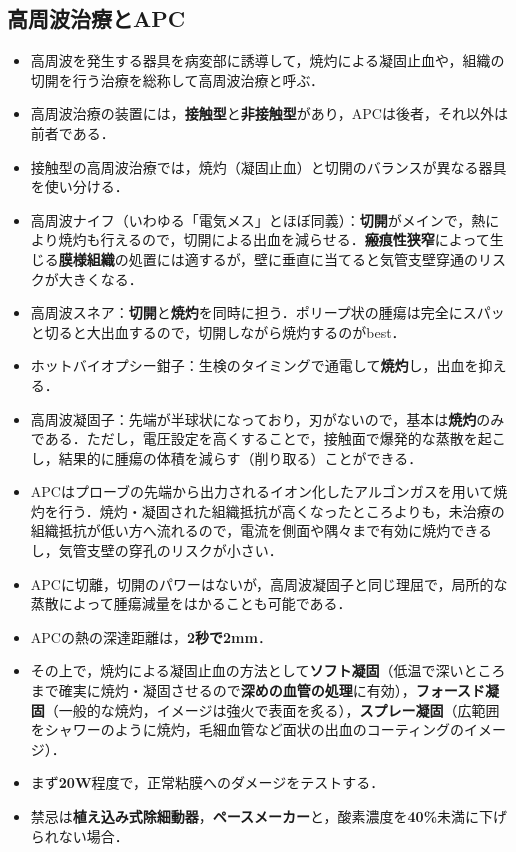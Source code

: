 \subsection{高周波治療とAPC}

\begin{itemize}
\item 高周波を発生する器具を病変部に誘導して，焼灼による凝固止血や，組織の切開を行う治療を総称して高周波治療と呼ぶ．
\item 高周波治療の装置には，\textbf{接触型}と\textbf{非接触型}があり，APCは後者，それ以外は前者である．
\item 接触型の高周波治療では，焼灼（凝固止血）と切開のバランスが異なる器具を使い分ける．
\item 高周波ナイフ（いわゆる「電気メス」とほぼ同義）：\textbf{切開}がメインで，熱により焼灼も行えるので，切開による出血を減らせる．\textbf{瘢痕性狭窄}によって生じる\textbf{膜様組織}の処置には適するが，壁に垂直に当てると気管支壁穿通のリスクが大きくなる．
\item 高周波スネア：\textbf{切開}と\textbf{焼灼}を同時に担う．ポリープ状の腫瘍は完全にスパッと切ると大出血するので，切開しながら焼灼するのがbest．
\item ホットバイオプシー鉗子：生検のタイミングで通電して\textbf{焼灼}し，出血を抑える．
\item 高周波凝固子：先端が半球状になっており，刃がないので，基本は\textbf{焼灼}のみである．ただし，電圧設定を高くすることで，接触面で爆発的な蒸散を起こし，結果的に腫瘍の体積を減らす（削り取る）ことができる．


\item APCはプローブの先端から出力されるイオン化したアルゴンガスを用いて焼灼を行う．焼灼・凝固された組織抵抗が高くなったところよりも，未治療の組織抵抗が低い方へ流れるので，電流を側面や隅々まで有効に焼灼できるし，気管支壁の穿孔のリスクが小さい．
\item APCに切離，切開のパワーはないが，高周波凝固子と同じ理屈で，局所的な蒸散によって腫瘍減量をはかることも可能である．
\item APCの熱の深達距離は，\textbf{2秒で2mm}．
\item その上で，焼灼による凝固止血の方法として\textbf{ソフト凝固}（低温で深いところまで確実に焼灼・凝固させるので\textbf{深めの血管の処理}に有効），\textbf{フォースド凝固}（一般的な焼灼，イメージは強火で表面を炙る），\textbf{スプレー凝固}（広範囲をシャワーのように焼灼，毛細血管など面状の出血のコーティングのイメージ）．

\item まず\textbf{20W}程度で，正常粘膜へのダメージをテストする．
\item 禁忌は\textbf{植え込み式除細動器}，\textbf{ペースメーカー}と，酸素濃度を\textbf{40\%}未満に下げられない場合．

\end{itemize}

